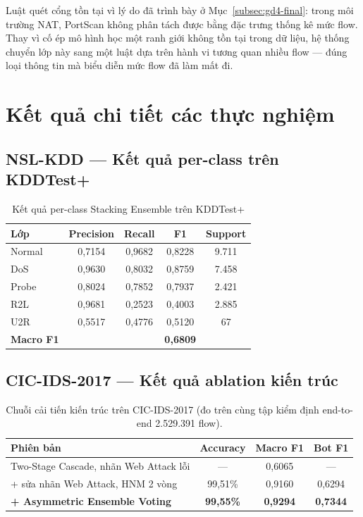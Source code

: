 \documentclass[../DoAn.tex]{subfiles}
\begin{document}
Luật quét cổng tồn tại vì lý do đã trình bày ở Mục~\ref{subsec:gd4-final}: trong môi trường NAT, PortScan không phân tách được bằng đặc trưng thống kê mức flow. Thay vì cố ép mô hình học một ranh giới không tồn tại trong dữ liệu, hệ thống chuyển lớp này sang một luật dựa trên hành vi tương quan nhiều flow --- đúng loại thông tin mà biểu diễn mức flow đã làm mất đi.

\section{Kết quả chi tiết các thực nghiệm}
\label{sec:plb-results}

\subsection{NSL-KDD --- Kết quả per-class trên KDDTest+}

\begin{table}[H]
    \centering
    \caption{Kết quả per-class Stacking Ensemble trên KDDTest+}
    \label{tab:res-nsl}
    \begin{tabular}{lcccc}
        \hline
        \textbf{Lớp} & \textbf{Precision} & \textbf{Recall} & \textbf{F1} & \textbf{Support} \\
        \hline
        Normal  & 0,7154 & 0,9682 & 0,8228 & 9.711 \\
        DoS     & 0,9630 & 0,8032 & 0,8759 & 7.458 \\
        Probe   & 0,8024 & 0,7852 & 0,7937 & 2.421 \\
        R2L     & 0,9681 & 0,2523 & 0,4003 & 2.885 \\
        U2R     & 0,5517 & 0,4776 & 0,5120 & 67 \\
        \hline
        \textbf{Macro F1} & & & \textbf{0,6809} & \\
        \hline
    \end{tabular}
\end{table}

\subsection{CIC-IDS-2017 --- Kết quả ablation kiến trúc}

\begin{table}[H]
    \centering
    \caption{Chuỗi cải tiến kiến trúc trên CIC-IDS-2017 (đo trên cùng tập kiểm định end-to-end 2.529.391 flow).}
    \label{tab:res-cic-ablation}
    \begin{tabular}{lccc}
        \hline
        \textbf{Phiên bản} & \textbf{Accuracy} & \textbf{Macro F1} & \textbf{Bot F1} \\
        \hline
        Two-Stage Cascade, nhãn Web Attack lỗi & --- & 0,6065 & --- \\
        + sửa nhãn Web Attack, HNM 2 vòng & 99,51\% & 0,9160 & 0,6294 \\
        \textbf{+ Asymmetric Ensemble Voting} & \textbf{99,55\%} & \textbf{0,9294} & \textbf{0,7344} \\
        \hline
    \end{tabular}
\end{table}
\end{document}
